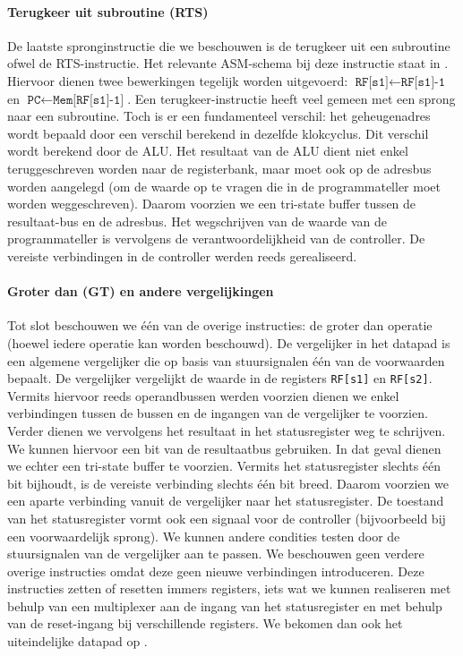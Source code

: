 \paragraph{Terugkeer uit subroutine (RTS)}
De laatste spronginstructie die we beschouwen is de terugkeer uit een subroutine ofwel de RTS-instructie. Het relevante ASM-schema bij deze instructie staat in . Hiervoor dienen twee bewerkingen tegelijk worden uitgevoerd: $\texttt{RF[s1]}\leftarrow\texttt{RF[s1]-1}$ en $\texttt{PC}\leftarrow\texttt{Mem[RF[s1]-1]}$. Een terugkeer-instructie heeft veel gemeen met een sprong naar een subroutine. Toch is er een fundamenteel verschil: het geheugenadres wordt bepaald door een verschil berekend in dezelfde klokcyclus. Dit verschil wordt berekend door de ALU. Het resultaat van de ALU dient niet enkel teruggeschreven worden naar de registerbank, maar moet ook op de adresbus worden aangelegd (om de waarde op te vragen die in de programmateller moet worden weggeschreven). Daarom voorzien we een tri-state buffer tussen de resultaat-bus en de adresbus. Het wegschrijven van de waarde van de programmateller is vervolgens de verantwoordelijkheid van de controller. De vereiste verbindingen in de controller werden reeds gerealiseerd.
\paragraph{Groter dan (GT) en andere vergelijkingen}
Tot slot beschouwen we \'e\'en van de overige instructies: de groter dan operatie (hoewel iedere operatie kan worden beschouwd). De vergelijker in het datapad is een algemene vergelijker die op basis van stuursignalen \'e\'en van de voorwaarden bepaalt. De vergelijker vergelijkt de waarde in de registers \texttt{RF[s1]} en \texttt{RF[s2]}. Vermits hiervoor reeds operandbussen werden voorzien dienen we enkel verbindingen tussen de bussen en de ingangen van de vergelijker te voorzien. Verder dienen we vervolgens het resultaat in het statusregister weg te schrijven. We kunnen hiervoor een bit van de resultaatbus gebruiken. In dat geval dienen we echter een tri-state buffer te voorzien. Vermits het statusregister slechts \'e\'en bit bijhoudt, is de vereiste verbinding slechts \'e\'en bit breed. Daarom voorzien we een aparte verbinding vanuit de vergelijker naar het statusregister. De toestand van het statusregister vormt ook een signaal voor de controller (bijvoorbeeld bij een voorwaardelijk sprong). We kunnen andere condities testen door de stuursignalen van de vergelijker aan te passen. We beschouwen geen verdere overige instructies omdat deze geen nieuwe verbindingen introduceren. Deze instructies zetten of resetten immers registers, iets wat we kunnen realiseren met behulp van een multiplexer aan de ingang van het statusregister en met behulp van de reset-ingang bij verschillende registers. We bekomen dan ook het uiteindelijke datapad op .
